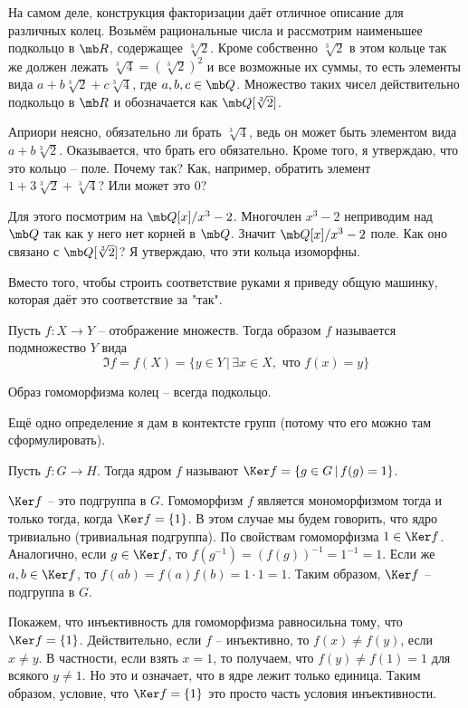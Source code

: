 На самом деле, конструкция факторизации даёт отличное описание для различных колец. Возьмём рациональные числа и рассмотрим наименьшее подкольцо в $\mb R$, содержащее $\sqrt[3]{2}$. Кроме собственно $\sqrt[3]{2}$ в этом кольце так же должен лежать $\sqrt[3]{4}=(\sqrt[3]{2})^2$ и все возможные их суммы, то есть элементы вида $a+b\sqrt[3]{2}+c\sqrt[3]{4}$, где $a,b,c \in \mb Q$. Множество таких чисел действительно подкольцо в $\mb R$ и обозначается как $\mb Q[\sqrt[3]{2}]$. 

Априори неясно, обязательно ли  брать $\sqrt[3]{4}$, ведь он может быть элементом вида $a+b\sqrt[3]{2}$. Оказывается, что брать его обязательно. Кроме того, я утверждаю, что  это кольцо --  поле. Почему так? Как, например, обратить элемент $1+3\sqrt[3]{2}+\sqrt[3]{4}$? Или может это 0?

Для этого посмотрим на $\mb Q[x]/x^3-2$. Многочлен $x^3-2$ неприводим над $\mb Q$ так как у него нет корней в $\mb Q$. Значит  $\mb Q[x]/x^3-2$ поле. Как оно связано с $\mb Q[\sqrt[3]{2}]$? Я утверждаю, что эти кольца изоморфны.

Вместо того, чтобы строить соответствие руками я приведу общую машинку, которая даёт это соответствие за "так". 

\dfn Пусть $f\colon X \to Y$ -- отображение множеств. Тогда образом $f$ называется подмножество $Y$ вида
$$\Im f= f(X)=\{y \in Y\, |\, \exists x \in X, \text{ что } f(x)=y\}$$
\edfn

\rm Образ гомоморфизма колец -- всегда подкольцо. 
\erm

Ещё одно определение я дам в контектсте групп (потому что его можно там сформулировать).

\dfn Пусть $f\colon G \to H$. Тогда ядром $f$ называют $\Ker f=\{g\in G\,|\, f(g)=1\}$.
\edfn

\lm $\Ker f$ -- это подгруппа в $G$. Гомоморфизм $f$ является мономорфизмом тогда и только тогда, когда $\Ker f=\{1\}$. В этом случае мы будем говорить, что  ядро тривиально (тривиальная подгруппа).
\elm
\proof По свойствам гомоморфизма $1\in \Ker f$. Аналогично, если $g \in \Ker f$, то $f(g^{-1})=(f(g))^{-1}=1^{-1}=1.$ Если же $a,b\in \Ker f$, то $f(ab)=f(a)f(b)=1\cdot 1=1$. Таким образом, $\Ker f $ -- подгруппа в $G$. 

Покажем, что инъективность для гомоморфизма равносильна тому, что $\Ker f=\{1\}$. Действительно, если $f$ -- инъективно, то $f(x)\neq f(y)$, если $x\neq y$. В частности, если взять $x=1$, то получаем, что $f(y)\neq f(1)=1$ для всякого $y\neq 1$. Но это и означает, что  в ядре лежит только единица.  
Таким образом, условие, что $\Ker f=\{1\}$ это просто часть условия инъективности.

